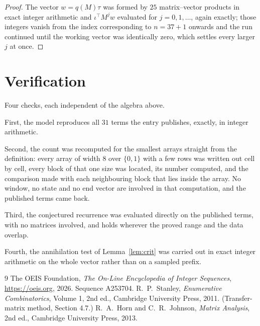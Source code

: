 \documentclass[11pt,a4paper]{article}
\theoremstyle{plain}
\theoremstyle{definition}
\begin{document}
\begin{proof}
The vector $w=q(M)\tau$ was formed by $25$ matrix--vector products in exact integer
arithmetic and $\iota^{\!\top}M^{j}w$ evaluated for $j=0,1,\dots$, again exactly; those
integers vanish from the index corresponding to $n=37+1$ onwards and the run continued
until the working vector was identically zero, which settles every larger $j$ at once.
\end{proof}

\section{Verification}

Four checks, each independent of the algebra above.

First, the model reproduces all $31$ terms the entry publishes, exactly, in integer
arithmetic.

Second, the count was recomputed for the smallest arrays straight from the definition: every
array of width $8$ over $\{0,1\}$ with a few rows was written out cell by cell, every block of
that one size was located, its number computed, and the comparison made with each neighbouring block
that lies inside the array. No window, no state and no end vector are involved in that
computation, and the published terms came back.

Third, the conjectured recurrence was evaluated directly on the published terms, with no
matrices involved, and holds wherever the proved range and the data overlap.

Fourth, the annihilation test of Lemma~\ref{lem:crit} was carried out in exact integer
arithmetic on the whole vector rather than on a sampled prefix.

\begin{thebibliography}{9}
 The OEIS Foundation, \emph{The On-Line Encyclopedia of Integer
Sequences}, \url{https://oeis.org}, 2026. Sequence A253704.
 R.~P.~Stanley, \emph{Enumerative Combinatorics}, Volume 1, 2nd ed.,
Cambridge University Press, 2011. (Transfer-matrix method, Section 4.7.)
 R.~A.~Horn and C.~R.~Johnson, \emph{Matrix Analysis}, 2nd ed., Cambridge
University Press, 2013.
\end{thebibliography}
\end{document}
